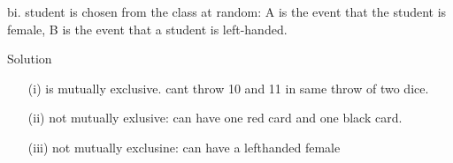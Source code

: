 bi.
student is chosen from the class at random: A is the event that the student is female, B is the event that a student is left-handed.






\begin{framed}


Solution

\begin{itemize}
\item[(i)] is mutually exclusive. cant throw 10 and 11 in same throw of two dice.


\item[(ii)] not mutually exlusive: can have one red card and one black card.


\item[(iii)] not mutually exclusine: can have a lefthanded female
\end{itemize}
\end{framed}





